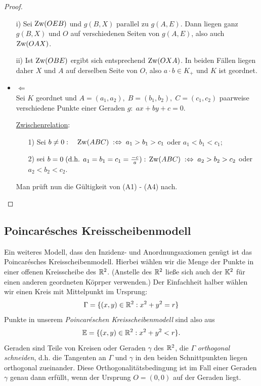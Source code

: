 \begin{proof}
\begin{itemize}
i) Sei $\operatorname{Zw}(OEB)$ und $g(B,X)$ parallel zu $g(A,E)$. Dann liegen ganz
$g(B,X)$ und $O$ auf verschiedenen Seiten von $g(A,E)$, also auch
$\operatorname{Zw}(OAX)$. 

ii) Ist $\operatorname{Zw}(OBE)$ ergibt sich entsprechend $\operatorname{Zw}(OXA)$. In
beiden F\"{a}llen liegen daher $X$ und $A$ auf derselben Seite von
$O$, also $a\cdot b\in K_+$ und $K$ ist geordnet.


\item
\glqq{}$\Longleftarrow$\grqq{}\\ 
Sei $K$ geordnet und
$A=(a_1,a_2),\;B=(b_1,b_2),\;C=(c_1,c_2)$ paarweise verschiedene
Punkte einer Geraden $g:\;ax+by+c=0$.

\underline{Zwischenrelation}:
\begin{enumerate}
    \item[1)] Sei $b\neq 0:\quad \operatorname{Zw}(ABC)\;:\Leftrightarrow\;a_1>b_1>c_1$ oder
        $a_1<b_1<c_1$;
    \item[2)] sei $b=0\;(\mbox{d.h. }a_1=b_1=c_1=\frac{-c}{a}):\\
        \operatorname{Zw}(ABC)\;:\Leftrightarrow\;a_2>b_2>c_2$ oder
        $a_2<b_2<c_2$.
\end{enumerate}
Man pr\"{u}ft nun die G\"{u}ltigkeit von (A1) - (A4) nach.
%
%
\end{itemize}
\end{proof}




\subsection*{Poincar\'esches Kreisscheibenmodell}

Ein weiteres Modell, dass den Inzidenz- und Anordnungsaxiomen genügt 
ist das Poincar\'esches Kreisscheibenmodell.
Hierbei wählen wir die Menge der Punkte in einer offenen
Kreisscheibe des $\mathbb R^2$. (Anstelle des $\mathbb R^2$ ließe sich auch der
$\mathbb K^2$ für einen anderen geordneten Köprper verwenden.)
Der Einfachheit halber wählen wir einen Kreis mit Mittelpunkt im Ursprung:
$$
\Gamma = \{ (x,y) \in \mathbb R^2 :  x^2+y^2 = r \}
$$
Punkte in unserem {\em  Poincar\'eschen Kreisscheibenmodell} sind also aus
$$
\mathbb E = \{ (x,y) \in \mathbb R^2 :  x^2+y^2 < r \}.
$$
Geraden sind Teile von Kreisen oder Geraden $\gamma$ des $\mathbb R^2$,
die $\Gamma$ {\em orthogonal schneiden}, d.h. die Tangenten an
$\Gamma$ und $\gamma$ in den beiden Schnittpunkten 
liegen orthogonal zueinander. Diese Orthogonalitätsbedingung ist im
Fall einer Geraden $\gamma$ genau dann erfüllt, wenn der Ursprung
$O=(0,0)$ auf der Geraden liegt.




